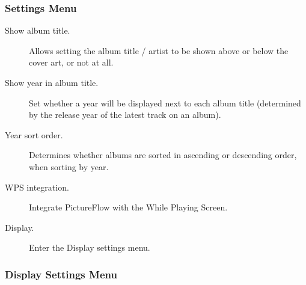 \subsubsection{Settings Menu}

\begin{description}
  \item[Show album title.] Allows setting the album title / artist to be
  shown above or below the cover art, or not at all.
  \item[Show year in album title.] Set whether a year will be displayed next to each album
  title (determined by the release year of the latest track on an album).
  \item[Year sort order.] Determines whether albums are sorted in ascending or descending
  order, when sorting by year.
  \item[WPS integration.] Integrate PictureFlow with the While Playing Screen.
  \item[Display.] Enter the Display settings menu.
\end{description}

\subsubsection{Display Settings Menu}

